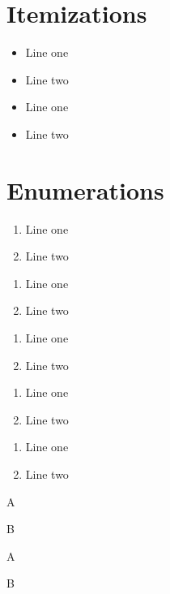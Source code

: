 \documentclass{article}
\begin{document}
\section{Itemizations}
\begin{itemize}
\item Line one
\item Line two
\end{itemize}

\begin{itemize}[label=\dag]
\item Line one
\item Line two
\end{itemize}

\section{Enumerations}
\begin{enumerate}[labelindent=\parindent,leftmargin=*]
\item Line one
\item Line two
\end{enumerate}

\begin{enumerate}[leftmargin=*] %
\item Line one
\item Line two
\end{enumerate}

\begin{enumerate}[leftmargin=\parindent]
\item Line one
\item Line two
\end{enumerate}

\begin{enumerate}[labelindent=\parindent, leftmargin=*, label=\Roman*., widest=III,align=left]
\item Line one
\item Line two
\end{enumerate}

\begin{enumerate}                                                     [label=\fbox{\arabic*}]
\item Line one
\item Line two
\end{enumerate}

\begin{fonty}[label=\arabic*)]  \item A \item B\end{fonty}
\begin{fonty}[label=\roman*{]}]  \item A \item B\end{fonty}
\end{document}
